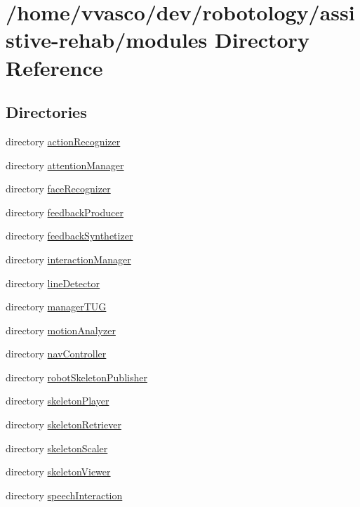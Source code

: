 \section{/home/vvasco/dev/robotology/assistive-\/rehab/modules Directory Reference}
\label{dir_e05d7e2b1ecd646af5bb94391405f3b5}
\subsection*{Directories}
\begin{DoxyCompactItemize}
\item 
directory \hyperlink{dir_7ee3331fa0268a1c262cd9cbdfaa2270}{action\+Recognizer}
\item 
directory \hyperlink{dir_a46a829c9ffa16e46d0a479a8cf947be}{attention\+Manager}
\item 
directory \hyperlink{dir_3f9f361010b3cb82c410f3e82d441f0f}{face\+Recognizer}
\item 
directory \hyperlink{dir_eb53649ee7c0d016bb4d0ffe2853685e}{feedback\+Producer}
\item 
directory \hyperlink{dir_a038ac0ec3ffe6af6669e585c468a820}{feedback\+Synthetizer}
\item 
directory \hyperlink{dir_43f189ed4c9d4d10d5414c952ee6763c}{interaction\+Manager}
\item 
directory \hyperlink{dir_ef396aeabc689f277fa0c177d341edef}{line\+Detector}
\item 
directory \hyperlink{dir_fa081b78cfedaeff997edb0a7ef43c6f}{manager\+T\+UG}
\item 
directory \hyperlink{dir_e74652c8acd73d6ffb9d13e855061106}{motion\+Analyzer}
\item 
directory \hyperlink{dir_66df65020ba08c75d6a49796cd595637}{nav\+Controller}
\item 
directory \hyperlink{dir_4d689b0a498683b7e47d4c62142a6334}{robot\+Skeleton\+Publisher}
\item 
directory \hyperlink{dir_e46cd9cc8e4e6a312e18701ed5b451b0}{skeleton\+Player}
\item 
directory \hyperlink{dir_90e7bf13f67f50f41f53c60514f9fbdb}{skeleton\+Retriever}
\item 
directory \hyperlink{dir_d1d99c40a208ca3b44df605fb028a0dc}{skeleton\+Scaler}
\item 
directory \hyperlink{dir_076126b4aff66e1e9c0a8ac969ab5c2f}{skeleton\+Viewer}
\item 
directory \hyperlink{dir_1fc5b13c52ad4f09d6a8a4dc8f9d2c43}{speech\+Interaction}
\end{DoxyCompactItemize}
